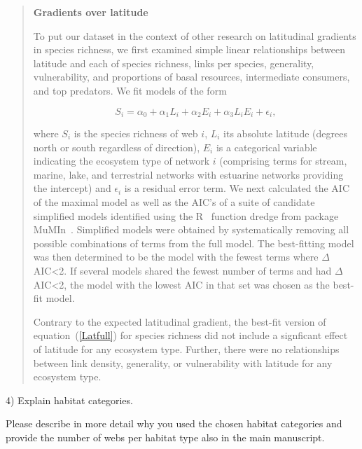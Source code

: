 \documentclass[12pt]{letter}
\newenvironment{refquote}{\bigskip \begin{it}}{\end{it}\smallskip}
\begin{document}
  \begin{quotation}

    \textbf{Gradients over latitude}

    To put our dataset in the context of other research on latitudinal gradients in species richness,
    we first examined simple linear relationships between latitude and each of 
    species richness, links per species, generality, vulnerability, and proportions
    of basal resources, intermediate consumers, and top predators. We fit models of the form

    \begin{equation}
    \label{Latfull}
    S_{i} = \alpha_{0} + \alpha_{1} L_{i} + \alpha_{2} E_{i} + \alpha_{3} L_{i} E_{i} + \epsilon_{i} ,
    \end{equation}

    \noindent where $S_{i}$ is the species richness of web $i$, $L_{i}$ its absolute
    latitude (degrees north or south  regardless of direction), $E_{i}$ is a categorical
    variable indicating the ecosystem type of network $i$ (comprising terms for stream, 
    marine, lake, and terrestrial networks with estuarine
    networks providing the intercept) and $\epsilon_{i}$ is a residual error term. 
    We next calculated the AIC
    of the maximal model as well as the AIC's of a suite of candidate simplified models identified
    using the R~\citep{R} function dredge from package MuMIn~\citep{MuMIn}. 
    Simplified models were obtained by
    systematically removing all possible combinations of terms from the full model.
    The best-fitting model was then determined to be the model with the fewest terms 
    where $\Delta$AIC\textless2. If several models shared the fewest number of terms 
    and had $\Delta$AIC\textless2, the model with the lowest AIC in that set was chosen as the best-fit
    model.


    \smallskip

    Contrary to the expected latitudinal gradient, the best-fit version of
    equation~(\ref{Latfull}) for species richness did not  include a signficant
    effect of latitude for any  ecosystem type. Further, there were no
    relationships between link density, generality, or vulnerability with
    latitude for any ecosystem type.

  \end{quotation}


  4) Explain habitat categories.

  \begin{refquote}

    Please describe in more detail why you used the chosen habitat categories
    and provide the number of webs per habitat type also in the main
    manuscript.

  \end{refquote}
\end{document}
